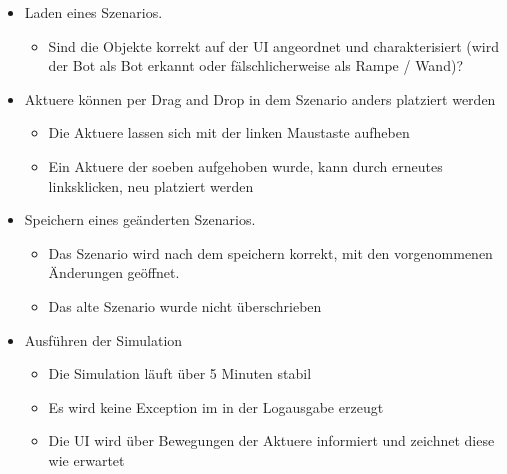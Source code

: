\begin{itemize}
\item Laden eines Szenarios.
	\begin{itemize}
	\item Sind die Objekte korrekt auf der UI angeordnet und charakterisiert (wird der Bot als Bot erkannt oder fälschlicherweise als Rampe / Wand)?
	\end{itemize}	
	
\item Aktuere können per Drag and Drop in dem Szenario anders platziert werden
	\begin{itemize}
	\item Die Aktuere lassen sich mit der linken Maustaste aufheben
	\item Ein Aktuere der soeben aufgehoben wurde, kann durch erneutes linksklicken, neu platziert werden
	\end{itemize}	

\item Speichern eines geänderten Szenarios.
	\begin{itemize}
	\item Das Szenario wird nach dem speichern korrekt, mit den vorgenommenen Änderungen geöffnet.
	\item Das alte Szenario wurde nicht überschrieben
	\end{itemize}	
	
\item Ausführen der Simulation
	\begin{itemize}
	\item Die Simulation läuft über 5 Minuten stabil
	\item Es wird keine Exception im in der Logausgabe erzeugt
	\item Die UI wird über Bewegungen der Aktuere informiert und zeichnet diese wie erwartet
	\end{itemize}	

\end{itemize}